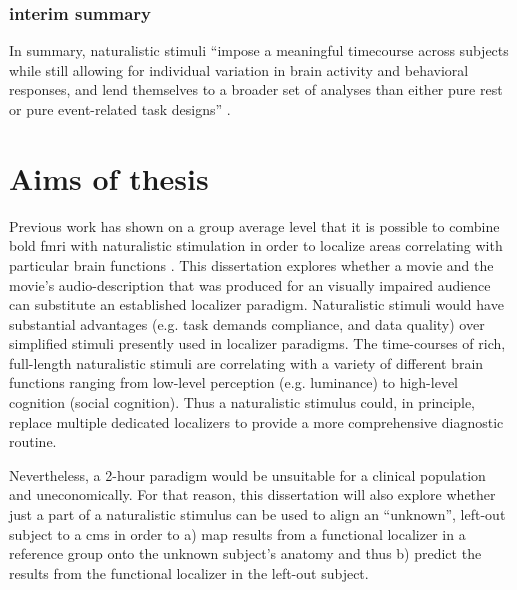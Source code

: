 

\subsubsection{interim summary}
In summary, naturalistic stimuli ``impose a meaningful timecourse across
subjects while still allowing for individual variation in brain activity and
behavioral responses, and lend themselves to a broader set of analyses than
either pure rest or pure event-related task designs'' \citep{finn2017can}.


\section{Aims of thesis}


%
Previous work has shown on a group average level that it is possible to combine
\ac{bold} \ac{fmri} with naturalistic stimulation in order to localize areas
correlating with particular brain functions \citep{bartels2004mapping}.
%
This dissertation explores whether a movie and the movie's audio-description
that was produced for an visually impaired audience can substitute an
established localizer paradigm.
%
Naturalistic stimuli would have substantial advantages (e.g. task demands
compliance, and data quality) over simplified stimuli presently used in
localizer paradigms.
%
The time-courses of rich, full-length naturalistic stimuli are correlating with
a variety of different brain functions ranging from low-level perception (e.g.
luminance) to high-level cognition (social cognition).
%
Thus a naturalistic stimulus could, in principle, replace multiple dedicated
localizers to provide a more comprehensive diagnostic routine.

%
Nevertheless, a 2-hour paradigm would be unsuitable for a clinical population
and uneconomically.
%
For that reason, this dissertation will also explore whether just a part of a
naturalistic stimulus can be used to align an ``unknown'', left-out subject to a
\ac{cms} in order to a) map results from a functional localizer in a reference
group onto the unknown subject's anatomy and thus b) predict the results from
the functional localizer in the left-out subject.
%

